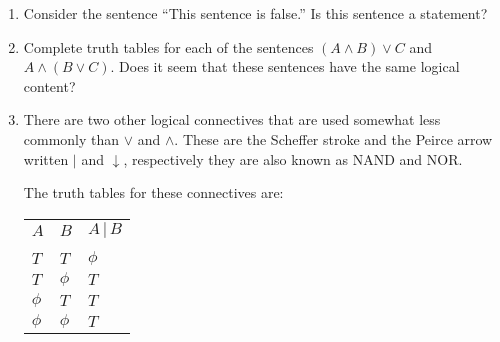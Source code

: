 \documentclass[10pt,]{book}
\theoremstyle{plain}
\theoremstyle{definition}
\theoremstyle{definition}
\numberwithin{equation}{section}
\newcommand{\hrulethin}  {\noalign{\hrule height 0.04em}}
\newcommand{\hint}[1]{ }
\begin{document}
\begin{enumerate}[label=(\alph*)]
{          Isn't it just plainly false?}
\item\hypertarget{li-109}{}
          Consider the sentence ``This sentence is false.''  Is this 
          sentence a statement?

          \hint{Try to justify why this sentence can't be either true or false.}
\item\hypertarget{li-110}{}
          Complete truth tables for each of the sentences 
          \((A \land B) \lor C\) and
          \(A \land (B \lor C)\).  Does it seem that these sentences have
          the same logical content?

          \hint{



          A tiny hint here: since the sentences involve 3 variables you'll need truth tables with 8 rows. Here's a template.
          \begin{tabular}{lllll}
&&&&\tabularnewline\hrulethin
\(A\)&\(B\)&\(C\)&\((A \land B) \lor C\)&\(A \land (B \lor C)\)\tabularnewline[0pt]
&&&&\tabularnewline\hrulethin
\(T\)&\(T\)&\(T\)&&\tabularnewline[0pt]
&&&&\tabularnewline\hrulethin
\(T\)&\(T\)&\(\phi\)&&\tabularnewline[0pt]
&&&&\tabularnewline\hrulethin
\(T\)&\(\phi\)&\(T\)&&\tabularnewline[0pt]
&&&&\tabularnewline\hrulethin
\(T\)&\(\phi\)&\(\phi\)&&\tabularnewline[0pt]
&&&&\tabularnewline\hrulethin
\(\phi\)&\(T\)&\(T\)&&\tabularnewline[0pt]
&&&&\tabularnewline\hrulethin
\(\phi\)&\(T\)&\(\phi\)&&\tabularnewline[0pt]
&&&&\tabularnewline\hrulethin
\(\phi\)&\(\phi\)&\(T\)&&\tabularnewline[0pt]
&&&&\tabularnewline\hrulethin
\(\phi\)&\(\phi\)&\(\phi\)&&\tabularnewline[0pt]
&&&&\tabularnewline\hrulethin
\end{tabular}

          }
\item\hypertarget{ex_nand_nor}{}
          There are two other logical connectives that are
          used somewhat less commonly than \(\lor\) and \(\land\).
          These are the  Scheffer stroke and the 
          Peirce arrow \textemdash{} written \(\vert\) and \(\downarrow\), respectively \textemdash{}  they are 
          also known as  NAND and  NOR.

           The truth tables for these connectives are:
          \begin{tabular}{lll}
\(A\)&\(B\)&\(A \,\vert\, B\)\tabularnewline[0pt]
&&\tabularnewline\hrulethin
\(T\)&\(T\)&\(\phi\)\tabularnewline[0pt]
\(T\)&\(\phi\)&\(T\)\tabularnewline[0pt]
\(\phi\)&\(T\)&\(T\)\tabularnewline[0pt]
\(\phi\)&\(\phi\)&\(T\)
\end{tabular}


\end{enumerate}
\end{document}
